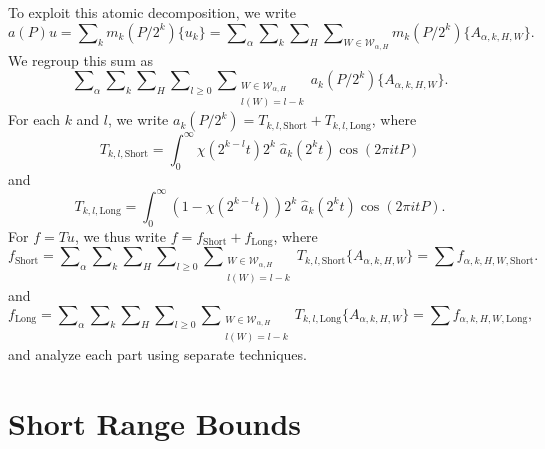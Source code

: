 To exploit this atomic decomposition, we write
%
\[ a(P) u = \sum\nolimits_k m_k(P/2^k) \{ u_k \} = \sum\nolimits_\alpha \sum\nolimits_k \sum\nolimits_H \sum\nolimits_{W \in \mathcal{W}_{\alpha,H}} m_k(P/2^k) \{ A_{\alpha,k,H,W} \}. \]
%
We regroup this sum as
%
\[ \sum\nolimits_\alpha \sum\nolimits_k \sum\nolimits_H \sum\nolimits_{l \geq 0} \sum\nolimits_{\substack{W \in \mathcal{W}_{\alpha,H}\\l(W) = l - k}} a_k(P/2^k) \{ A_{\alpha,k,H,W} \}. \]
%
For each $k$ and $l$, we write $a_k(P/2^k) = T_{k,l,\text{Short}} + T_{k,l,\text{Long}}$, where
%
\[ T_{k,l,\text{Short}} = \int_0^\infty \chi( 2^{k-l} t ) 2^k\;\! \widehat{a}_k(2^k t) \cos(2 \pi i t P) \]
%
and
%
\[ T_{k,l,\text{Long}} = \int_0^\infty (1 - \chi(2^{k-l} t )) 2^k\;\! \widehat{a}_k(2^k t) \cos(2 \pi i t P).  \]
%
For $f = Tu$, we thus write $f = f_{\text{Short}} + f_{\text{Long}}$, where
%
\[ f_{\text{Short}} = \sum\nolimits_\alpha \sum\nolimits_k \sum\nolimits_H \sum\nolimits_{l \geq 0} \sum\nolimits_{\substack{W \in \mathcal{W}_{\alpha,H}\\l(W) = l - k}} T_{k,l,\text{Short}} \{ A_{\alpha,k,H,W} \} = \sum f_{\alpha,k,H,W,\text{Short}}. \]
%
and
%
\[ f_{\text{Long}} = \sum\nolimits_\alpha \sum\nolimits_k \sum\nolimits_H \sum\nolimits_{l \geq 0} \sum\nolimits_{\substack{W \in \mathcal{W}_{\alpha,H}\\l(W) = l - k}} T_{k,l,\text{Long}} \{ A_{\alpha,k,H,W} \} = \sum f_{\alpha,k,H,W,\text{Long}}, \]
%
and analyze each part using separate techniques.

\section{Short Range Bounds}

